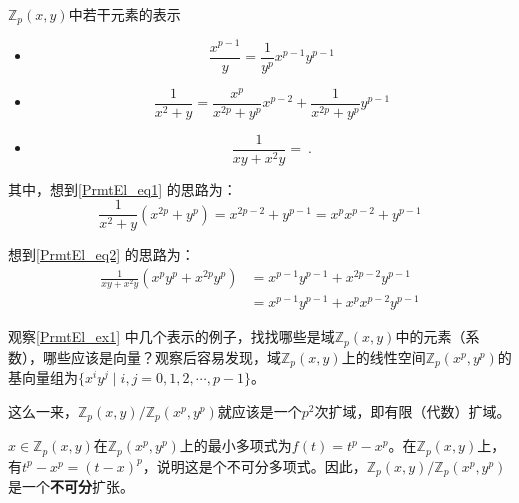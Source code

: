 \begin{example}{$\mathbb{Z}_p(x, y)$中若干元素的表示}\label{PrmtEl_ex1}


\begin{itemize}

\item 
\begin{equation}
\frac{x^{p-1}}{y} = \frac{1}{y^p}x^{p-1}y^{p-1}
\end{equation}

\item 
\begin{equation}\label{PrmtEl_eq1}
\frac{1}{x^2+y} = \frac{x^p}{x^{2p}+y^p}x^{p-2} + \frac{1}{x^{2p}+y^p}y^{p-1}
\end{equation}

\item 
\begin{equation}\label{PrmtEl_eq2}
\frac{1}{xy+x^2y} = ~.
\end{equation}

\end{itemize}



其中，想到\autoref{PrmtEl_eq1} 的思路为：
\begin{equation}
\frac{1}{x^2+y}(x^{2p}+y^p) = x^{2p-2}+y^{p-1} = x^px^{p-2}+y^{p-1}
\end{equation}

想到\autoref{PrmtEl_eq2} 的思路为：
\begin{equation}
\begin{aligned}
\frac{1}{xy+x^2y}(x^py^p+x^{2p}y^p) &= x^{p-1}y^{p-1}+x^{2p-2}y^{p-1} \\
&= x^{p-1}y^{p-1}+x^px^{p-2}y^{p-1}
\end{aligned}
\end{equation}

\end{example}

观察\autoref{PrmtEl_ex1} 中几个表示的例子，找找哪些是域$\mathbb{Z}_p(x, y)$中的元素（系数），哪些应该是向量？观察后容易发现，域$\mathbb{Z}_p(x, y)$上的线性空间$\mathbb{Z}_p(x^p, y^p)$的基向量组为$\{x^iy^j\mid i, j=0, 1, 2, \cdots, p-1\}$。

这么一来，$\mathbb{Z}_p(x, y)/\mathbb{Z}_p(x^p, y^p)$就应该是一个$p^2$次扩域，即有限（代数）扩域。

$x\in\mathbb{Z}_p(x, y)$在$\mathbb{Z}_p(x^p, y^p)$上的最小多项式为$f(t)=t^p-x^p$。在$\mathbb{Z}_p(x, y)$上，有$t^p-x^p=(t-x)^p$，说明这是个不可分多项式。因此，$\mathbb{Z}_p(x, y)/\mathbb{Z}_p(x^p, y^p)$是一个\textbf{不可分}扩张。


